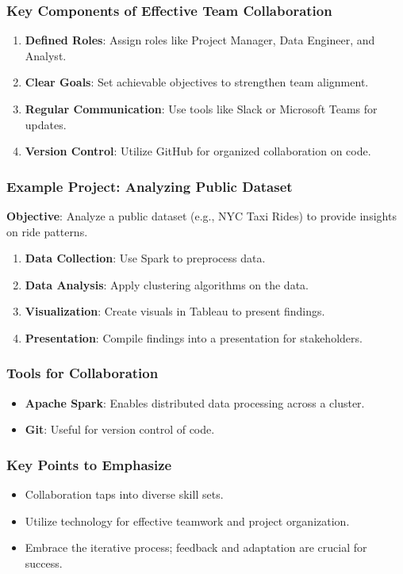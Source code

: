 \documentclass[aspectratio=169]{beamer}
\begin{document}
\begin{frame}[fragile]
  \frametitle{Key Components of Effective Team Collaboration}
  \begin{enumerate}
    \item \textbf{Defined Roles}: Assign roles like Project Manager, Data Engineer, and Analyst.
    \item \textbf{Clear Goals}: Set achievable objectives to strengthen team alignment.
    \item \textbf{Regular Communication}: Use tools like Slack or Microsoft Teams for updates.
    \item \textbf{Version Control}: Utilize GitHub for organized collaboration on code.
  \end{enumerate}
\end{frame}

\begin{frame}[fragile]
  \frametitle{Example Project: Analyzing Public Dataset}
  \textbf{Objective}: Analyze a public dataset (e.g., NYC Taxi Rides) to provide insights on ride patterns.
  \begin{enumerate}
    \item \textbf{Data Collection}: Use Spark to preprocess data.
    \item \textbf{Data Analysis}: Apply clustering algorithms on the data.
    \item \textbf{Visualization}: Create visuals in Tableau to present findings.
    \item \textbf{Presentation}: Compile findings into a presentation for stakeholders.
  \end{enumerate}
\end{frame}

\begin{frame}[fragile]
  \frametitle{Tools for Collaboration}
  \begin{itemize}
    \item \textbf{Apache Spark}: Enables distributed data processing across a cluster.
    \item \textbf{Git}: Useful for version control of code.
  \end{itemize}
\end{frame}

\begin{frame}[fragile]
  \frametitle{Key Points to Emphasize}
  \begin{itemize}
    \item Collaboration taps into diverse skill sets.
    \item Utilize technology for effective teamwork and project organization.
    \item Embrace the iterative process; feedback and adaptation are crucial for success.
  \end{itemize}
\end{frame}
\end{document}
